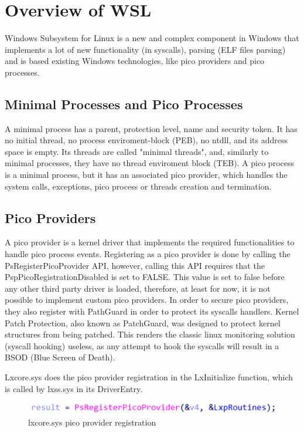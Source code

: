 \documentclass[conference]{IEEEtran}
\begin{document}
\section{Overview of WSL}
    Windows Subsystem for Linux is a new and complex component in Windows that implements a lot of new functionality (in syscalls), parsing
    (ELF files parsing) and is based existing Windows technologies, like pico providers and pico processes.

    \subsection{Minimal Processes and Pico Processes}
    A minimal process has a parent, protection level, name and security token. It has no initial thread, no process enviroment-block (PEB),
    no ntdll, and its address space is empty. Its threads are called "minimal threads", and, similarly to minimal processes, they have no
    thread enviroment block (TEB). A pico process is a minimal process, but it has an associated pico provider, which handles the system calls,
    exceptions, pico process or threads creation and termination.

    \subsection{Pico Providers}
    A pico provider is a kernel driver that implements the required functionalities to handle pico process events. Registering as a pico provider
    is done by calling the PsRegisterPicoProvider API, however, calling this API requires that the PspPicoRegistrationDisabled is set to FALSE.
    This value is set to false before any other third party driver is loaded, therefore, at least for now, it is not possible to implement
    custom pico providers. In order to secure pico providers, they also register with PathGuard in order to protect its syscalls handlers.
    Kernel Patch Protection, also known as PatchGuard, was designed to protect kernel structures from being patched. This renders the classic
    linux monitoring solution (syscall hooking) useless, as any attempt to hook the syscalls will result in a BSOD (Blue Screen of Death).

    \par{}
    Lxcore.sys does the pico provider registration in the LxInitialize function, which is called by lxss.sys in its DriverEntry.
    \begin{figure}[htbp]
        \centerline{\includegraphics{PsRegisterPicoProcess.png}}
        \caption{lxcore.sys pico provider registration}
        \label{fig1}
    \end{figure}
\end{document}

